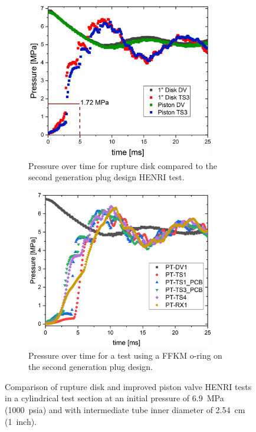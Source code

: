 \begin{figure}[bt]
    \vspace{16pt}
    \centering
    \begin{subfigure}[t]{0.45\textwidth}
        \centering
        \includegraphics[width=0.9\textwidth]{results/plots/BD_Piston_overlay_1000.png}
        \caption{Pressure over time for rupture disk compared to the second generation plug design HENRI test.}
        \label{fig:disk new}
    \end{subfigure}
    \hfill
    \begin{subfigure}[t]{0.45\textwidth}
        \centering
        \includegraphics[width=0.9\textwidth]{results/plots/1000psi_Mpa_25.png}
        \caption{Pressure over time for a test using a FFKM o-ring on the second generation plug design.}
        \label{fig:piston 1000psi 25ms}
    \end{subfigure}
    
    \caption{Comparison of rupture disk and improved piston valve HENRI tests in a cylindrical test section at an initial pressure of \SI{6.9}{\mega\pascal} (\SI{1000}{psia}) and with intermediate tube inner diameter of \SI{2.54}{\centi\meter} (\SI{1}{inch}).}
    \label{fig:new piston v disk}
    \vspace{16pt}
\end{figure}

